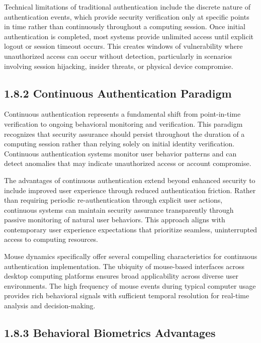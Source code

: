 \documentclass[
  12pt,
  a4paper,
]{report}
\begin{document}
Technical limitations of traditional authentication include the discrete
nature of authentication events, which provide security verification
only at specific points in time rather than continuously throughout a
computing session. Once initial authentication is completed, most
systems provide unlimited access until explicit logout or session
timeout occurs. This creates windows of vulnerability where unauthorized
access can occur without detection, particularly in scenarios involving
session hijacking, insider threats, or physical device compromise.

\subsection{1.8.2 Continuous Authentication
Paradigm}\label{continuous-authentication-paradigm}

Continuous authentication represents a fundamental shift from
point-in-time verification to ongoing behavioral monitoring and
verification. This paradigm recognizes that security assurance should
persist throughout the duration of a computing session rather than
relying solely on initial identity verification. Continuous
authentication systems monitor user behavior patterns and can detect
anomalies that may indicate unauthorized access or account compromise.

The advantages of continuous authentication extend beyond enhanced
security to include improved user experience through reduced
authentication friction. Rather than requiring periodic
re-authentication through explicit user actions, continuous systems can
maintain security assurance transparently through passive monitoring of
natural user behaviors. This approach aligns with contemporary user
experience expectations that prioritize seamless, uninterrupted access
to computing resources.

Mouse dynamics specifically offer several compelling characteristics for
continuous authentication implementation. The ubiquity of mouse-based
interfaces across desktop computing platforms ensures broad
applicability across diverse user environments. The high frequency of
mouse events during typical computer usage provides rich behavioral
signals with sufficient temporal resolution for real-time analysis and
decision-making.

\subsection{1.8.3 Behavioral Biometrics
Advantages}\label{behavioral-biometrics-advantages}
\end{document}
